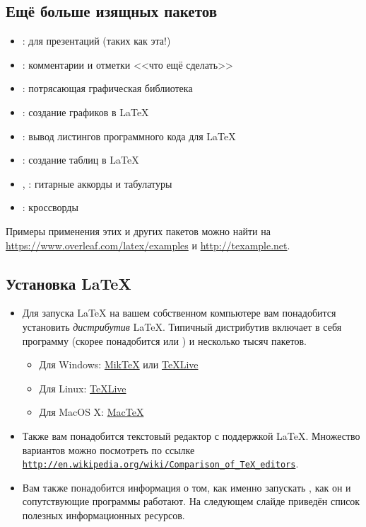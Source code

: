 \documentclass{beamer}
\begin{document}
\subsection{Ещё больше изящных пакетов}
\begin{frame}{\insertsubsection}
\begin{itemize}
  \item {}: для презентаций (таких как эта!)
\item {}: комментарии и отметки <<что ещё сделать>>
\item {}: потрясающая графическая библиотека
\item {}: создание графиков в \LaTeX
\item {}: вывод листингов программного кода для \LaTeX
\item {}: создание таблиц в \LaTeX
\item {}, : гитарные аккорды и табулатуры
\item {}: кроссворды
\end{itemize}
Примеры применения этих и других пакетов можно найти на
\url{https://www.overleaf.com/latex/examples} и \url{http://texample.net}.
\end{frame}

\subsection{Установка \LaTeX{}}
\begin{frame}{\insertsubsection}
\begin{itemize}
\item Для запуска \LaTeX{} на вашем собственном компьютере вам понадобится установить
\emph{дистрибутив} \LaTeX{}. Типичный дистрибутив включает в себя программу 
(скорее понадобится  или ) и несколько тысяч пакетов.
\begin{itemize}
\item Для Windows: \href{http://miktex.org/}{Mik\TeX} или \href{http://tug.org/texlive/}{\TeX Live}
\item Для Linux: \href{http://tug.org/texlive/}{\TeX Live}
\item Для MacOS X: \href{http://tug.org/mactex/}{Mac\TeX}
\end{itemize}
\item Также вам понадобится текстовый редактор с поддержкой \LaTeX{}. Множество
вариантов можно посмотреть по ссылке
\href{http://en.wikipedia.org/wiki/Comparison_of_TeX_editors}%
{\mbox{\texttt{http://en.wikipedia.org/wiki/Comparison\_of\_TeX\_editors}}}.
\item Вам также понадобится информация о том, как именно запускать ,
как он и сопутствующие программы работают. На следующем слайде приведён список
полезных информационных ресурсов.
\end{itemize}
\end{frame}
\end{document}
